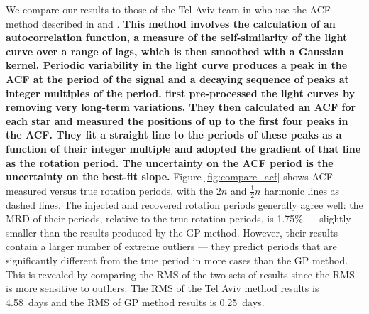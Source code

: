 \documentclass[a4paper,fleqn,usenatbib,useAMS]{mnras}
\newcommand{\ie}{{\it i.e.}}
\newcommand{\gpRMS}{0.25}
\newcommand{\telavivRMS}{4.58}
\newcommand{\percenttelavivMAD}{1.75}
\begin{document}
We compare our results to those of the Tel Aviv team in \citet{Aigrain2015}
who use the ACF method described in \citet{Mcquillan2014} and
\citet{Aigrain2015}.
{\bf This method involves the calculation of an autocorrelation function, a
measure of the self-similarity of the light curve over a range of lags, which
is then smoothed with a Gaussian kernel.
Periodic variability in the light curve produces a peak in the ACF at the
period of the signal and a decaying sequence of peaks at integer multiples of
the period.
\citet{Mcquillan2014} first pre-processed the light curves by removing very
long-term variations.
They then calculated an ACF for each star and measured the positions of up to
the first four peaks in the ACF.
They fit a straight line to the periods of these peaks as a function of their
integer multiple and adopted the gradient of that line as the rotation
period.
The uncertainty on the ACF period is the uncertainty on the best-fit slope.
}
Figure \ref{fig:compare_acf} shows ACF-measured versus true rotation
periods, with the $2n$ and $\frac{1}{2}n$ harmonic lines as dashed lines.
The injected and recovered rotation periods generally agree well: the MRD of
their periods, relative to the true rotation periods, is \percenttelavivMAD\%
--- slightly smaller than the results produced by the GP method.
However, their results contain a larger number of extreme outliers --- they
predict periods that are significantly different from the true period in more
cases than the GP method.
This is revealed by comparing the RMS of the two sets of results since the RMS
is more sensitive to outliers.
The RMS of the Tel Aviv method results is \telavivRMS\ days and the RMS of GP
method results is \gpRMS\ days.

\end{document}
